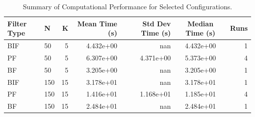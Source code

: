 \begin{table}
\caption{Summary of Computational Performance for Selected Configurations.}
\label{tab:comp_perf_summary}
\begin{tabular}{llrrrcr}
\toprule
Filter Type & N & K & Mean Time (s) & Std Dev Time (s) & Median Time (s) & Runs \\
\midrule
BIF & 50 & 5 & 4.432e+00 & nan & 4.432e+00 & 1 \\
PF & 50 & 5 & 6.307e+00 & 4.371e+00 & 5.373e+00 & 4 \\
BF & 50 & 5 & 3.205e+00 & nan & 3.205e+00 & 1 \\
BIF & 150 & 15 & 3.178e+01 & nan & 3.178e+01 & 1 \\
PF & 150 & 15 & 1.416e+01 & 1.168e+01 & 1.185e+01 & 4 \\
BF & 150 & 15 & 2.484e+01 & nan & 2.484e+01 & 1 \\
\bottomrule
\end{tabular}
\end{table}
